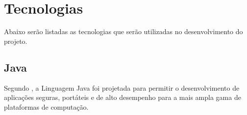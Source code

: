 % 


% 


\section{Tecnologias}

\par Abaixo serão listadas as tecnologias que serão utilizadas no
desenvolvimento do projeto.

\subsection{Java}

\par Segundo , a Linguagem Java foi projetada
para permitir o desenvolvimento de aplicações seguras, portáteis
e de alto desempenho para a mais ampla gama de plataformas de computação.

